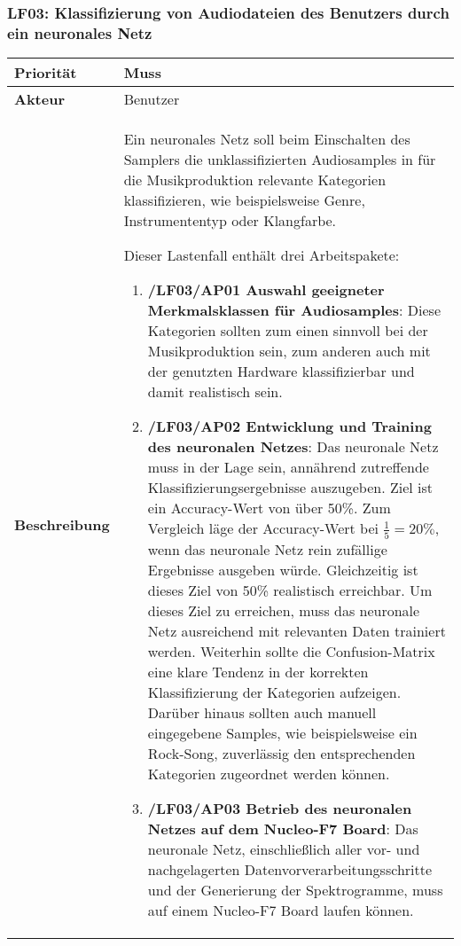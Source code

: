 \subsubsection{LF03: Klassifizierung von Audiodateien des Benutzers durch ein neuronales Netz}
\label{lf-nn-01}

\begin{table}[h!]
	\begin{tabularx}{\textwidth}{|l|X|}
		\hline
		\textbf{Priorität} & Muss \\ \hline
		\textbf{Akteur} & Benutzer \\ \hline
		\textbf{Beschreibung} & Ein neuronales Netz soll beim Einschalten des Samplers die unklassifizierten Audiosamples in für die Musikproduktion relevante Kategorien klassifizieren, wie beispielsweise Genre, Instrumententyp oder Klangfarbe.
		
		Dieser Lastenfall enthält drei Arbeitspakete:
		\begin{enumerate}
    		\item \textbf{/LF03/AP01 Auswahl geeigneter Merkmalsklassen für Audiosamples}: Diese Kategorien sollten zum einen sinnvoll bei der Musikproduktion sein, zum anderen auch mit der genutzten Hardware klassifizierbar und damit realistisch sein.
    		\item \textbf{/LF03/AP02 Entwicklung und Training des neuronalen Netzes}: Das neuronale Netz muss in der Lage sein, annährend zutreffende Klassifizierungsergebnisse auszugeben. Ziel ist ein Accuracy-Wert von über 50\%. Zum Vergleich läge der Accuracy-Wert bei \textit{$\frac{1}{5} = 20\%$}, wenn das neuronale Netz rein zufällige Ergebnisse ausgeben würde. Gleichzeitig ist dieses Ziel von 50\% realistisch erreichbar. Um dieses Ziel zu erreichen, muss das neuronale Netz ausreichend mit relevanten Daten trainiert werden. Weiterhin sollte die Confusion-Matrix eine klare Tendenz in der korrekten Klassifizierung der Kategorien aufzeigen. Darüber hinaus sollten auch manuell eingegebene Samples, wie beispielsweise ein Rock-Song, zuverlässig den entsprechenden Kategorien zugeordnet werden können. 
			\item \textbf{/LF03/AP03 Betrieb des neuronalen Netzes auf dem Nucleo-F7 Board}: Das neuronale Netz, einschließlich aller vor- und nachgelagerten Datenvorverarbeitungsschritte und der Generierung der Spektrogramme, muss auf einem Nucleo-F7 Board laufen können. 
		\end{enumerate}
		\\ \hline
	\end{tabularx}
\end{table}